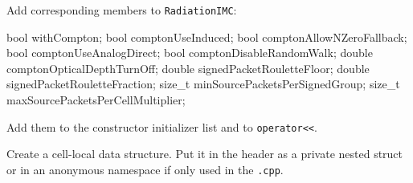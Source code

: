 \documentclass[
]{article}
\newenvironment{Shaded}{}{}
\newcommand{\DataTypeTok}[1]{\textcolor[rgb]{0.56,0.13,0.00}{#1}}
\newcommand{\NormalTok}[1]{#1}
\newcommand{\OperatorTok}[1]{\textcolor[rgb]{0.40,0.40,0.40}{#1}}
\begin{document}
Add corresponding members to \texttt{RadiationIMC}:

\begin{Shaded}
\begin{Highlighting}[]
\DataTypeTok{bool}\NormalTok{ withCompton}\OperatorTok{;}
\DataTypeTok{bool}\NormalTok{ comptonUseInduced}\OperatorTok{;}
\DataTypeTok{bool}\NormalTok{ comptonAllowNZeroFallback}\OperatorTok{;}
\DataTypeTok{bool}\NormalTok{ comptonUseAnalogDirect}\OperatorTok{;}
\DataTypeTok{bool}\NormalTok{ comptonDisableRandomWalk}\OperatorTok{;}
\DataTypeTok{double}\NormalTok{ comptonOpticalDepthTurnOff}\OperatorTok{;}
\DataTypeTok{double}\NormalTok{ signedPacketRouletteFloor}\OperatorTok{;}
\DataTypeTok{double}\NormalTok{ signedPacketRouletteFraction}\OperatorTok{;}
\DataTypeTok{size\_t}\NormalTok{ minSourcePacketsPerSignedGroup}\OperatorTok{;}
\DataTypeTok{size\_t}\NormalTok{ maxSourcePacketsPerCellMultiplier}\OperatorTok{;}
\end{Highlighting}
\end{Shaded}

Add them to the constructor initializer list and to
\texttt{operator\textless{}\textless{}}.

Create a cell-local data structure. Put it in the header as a private
nested struct or in an anonymous namespace if only used in the
\texttt{.cpp}.
\end{document}
